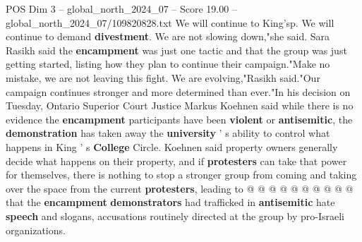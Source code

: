 \begin{textsample}{POS Dim 3 – global\_north\_2024\_07 – Score 19.00 – global\_north\_2024\_07/109820828.txt}
We will continue to King'sp.
We will continue to demand \textbf{divestment}.
We are not slowing down,"she said.
Sara Rasikh said the \textbf{encampment} was just one tactic and that the group was just getting started, listing how they plan to continue their campaign."Make no mistake, we are not leaving this fight.
We are evolving,"Rasikh said."Our campaign continues stronger and more determined than ever."In his decision on Tuesday, Ontario Superior Court Justice Markus Koehnen said while there is no evidence the \textbf{encampment} participants have been \textbf{violent} or \textbf{antisemitic}, the \textbf{demonstration} has taken away the \textbf{university} ' s ability to control what happens in King ' s \textbf{College} Circle.
Koehnen said property owners generally decide what happens on their property, and if \textbf{protesters} can take that power for themselves, there is nothing to stop a stronger group from coming and taking over the space from the current \textbf{protesters}, leading to @ @ @ @ @ @ @ @ @ @ that the \textbf{encampment} \textbf{demonstrators} had trafficked in \textbf{antisemitic} hate \textbf{speech} and slogans, accusations routinely directed at the group by pro-Israeli organizations.

\end{textsample}
